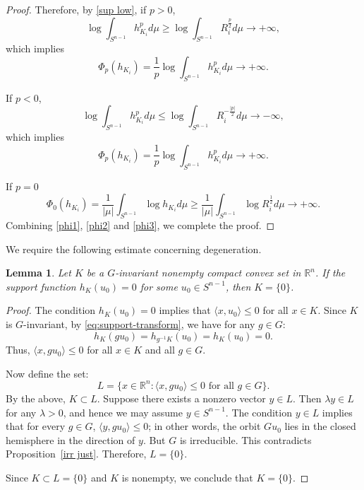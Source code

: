 \documentclass[12pt, reqno]{amsart}
\newtheorem{lemma}[theorem]{Lemma}
\theoremstyle{definition}
\theoremstyle{remark}
\numberwithin{equation}{section}
\newcommand{\Sn}{S^{n-1}}
\begin{document}
\begin{proof}
	 Therefore, by \eqref{sup low}, if $p> 0$,
	 \begin{equation*}
	 	 \log \int_{S^{n-1}} h_{K_{i}}^{p}  d\mu\ge 	 \log \int_{S^{n-1}} R_{i}^{\frac{p}{2}}  d\mu \rightarrow +\infty,
	 \end{equation*}
	 which implies 
	 \begin{equation}\label{phi1}
	 	\Phi_{p}(h_{K_{i}}) = \frac{1}{p} \log \int_{S^{n-1}} h_{K_{i}}^{p}  d\mu\rightarrow +\infty.
	 \end{equation}
	 
	 If $p<0$, 
	  \begin{equation*}
	 	\log \int_{S^{n-1}} h_{K_{i}}^{p}  d\mu\le 	 \log \int_{S^{n-1}} R_{i}^{-\frac{|p|}{2}}  d\mu \rightarrow -\infty,
	 \end{equation*}
	 which implies 
	 \begin{equation}\label{phi2}
	 	\Phi_{p}(h_{K_{i}}) = \frac{1}{p} \log \int_{S^{n-1}} h_{K_{i}}^{p}  d\mu\rightarrow +\infty.
	 \end{equation}
	 
	 If $p=0$
	 \begin{equation}\label{phi3}
	 	\Phi_{0}(h_{K_{i}}) = \frac{1}{|\mu|} \int _{S^{n-1}}\log h_{K_{i}}  d\mu \ge \frac{1}{|\mu|} \int_{S^{n-1}} \log R_{i}^{\frac{1}{2}}  d\mu \rightarrow +\infty.
	 \end{equation}
	 Combining \eqref{phi1}, \eqref{phi2} and \eqref{phi3}, we complete the proof.
	\end{proof} 

	We require the following estimate concerning degeneration.
	
	\begin{lemma}\label{degener}
		 Let \(K\) be a \(G\)-invariant nonempty compact convex set in \(\mathbb{R}^n\). If the support function \(h_K(u_{0}) = 0\) for some \(u_{0} \in S^{n-1}\), then \(K = \{0\}\).
		
	\end{lemma}
	
	\begin{proof}
	 The condition \(h_K(u_{0}) = 0\) implies that \(\langle x, u_{0} \rangle \leq 0\) for all \(x \in K\).
		Since 
		\(K\) is \(G\)-invariant, by \eqref{eq:support-transform}, we have for any \(g \in G\):
		\[
		h_K(gu_{0}) =  h_{g^{-1}K}(u_{0})
		= h_K(u_{0}) = 0.
		\]
	 Thus, \(\langle x, gu_{0} \rangle \leq 0\) for all \(x \in K\) and all \(g \in G\).
		
		
		Now define the set:
		\[
		L = 
		\{ x \in \mathbb{R}^n: \langle x, gu_{0} \rangle \leq 0 \text{ for all } g \in G \}.
				\]
		By the above, 
		\(K \subset L\). 
		Suppose there exists a nonzero vector \( y \in L \). Then \( \lambda y \in L \) for any \( \lambda > 0 \), and hence we may assume \( y \in \Sn \). The condition \( y \in L \) implies that for every \( g \in G \),  \( \langle y, gu_{0} \rangle \leq 0 \); in other words, the orbit \( Gu_{0} \) lies in the closed hemisphere in the direction of \( y \). But $G$ is irreducible. This contradicts Proposition~\ref{irr just}. Therefore, \(L = \{0\}\).
		
		
		Since 
		\(K \subset L = \{0\}\) and \(K\) is nonempty, we conclude that \(K = \{0\}\).
	\end{proof}
	
\end{document}
